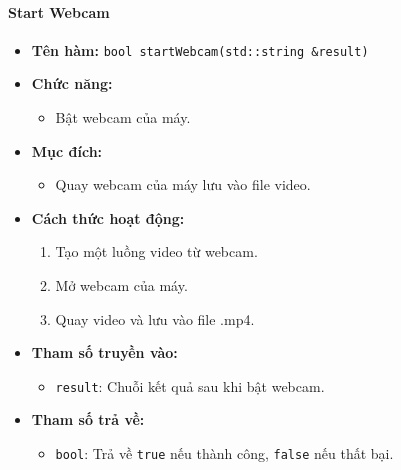 \paragraph{Start Webcam}
\begin{itemize}
    \item \textbf{Tên hàm:} \texttt{bool startWebcam(std::string \&result)}
    \item \textbf{Chức năng:}
    \begin{itemize}
        \item Bật webcam của máy.
    \end{itemize}
    \item \textbf{Mục đích:}
    \begin{itemize}
        \item Quay webcam của máy lưu vào file video.
    \end{itemize}
    \item \textbf{Cách thức hoạt động:}
    \begin{enumerate}
        \item Tạo một luồng video từ webcam.
        \item Mở webcam của máy.
        \item Quay video và lưu vào file .mp4.
    \end{enumerate}
    \item \textbf{Tham số truyền vào:}
    \begin{itemize}
        \item \texttt{result}: Chuỗi kết quả sau khi bật webcam.
    \end{itemize}
    \item \textbf{Tham số trả về:}
    \begin{itemize}
        \item \texttt{bool}: Trả về \texttt{true} nếu thành công, \texttt{false} nếu thất bại.
    \end{itemize}
\end{itemize}

